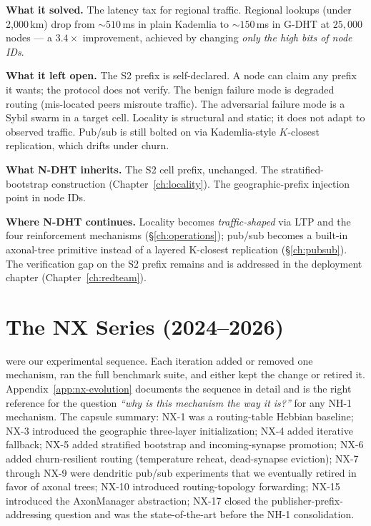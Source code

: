 \documentclass[twoside,nobib]{tufte-book}
\newcommand{\NDHT}{N-DHT\xspace}
\newcommand{\GDHT}{G-DHT\xspace}
\begin{document}
\textbf{What it solved.} The latency tax for regional traffic.
Regional lookups (under 2{,}000\,km) drop from $\sim 510$\,ms in
plain Kademlia to $\sim 150$\,ms in \GDHT at $25{,}000$ nodes ---
a $3.4\times$ improvement, achieved by changing \emph{only the
high bits of node IDs}.

\textbf{What it left open.} The S2 prefix is self-declared. A
node can claim any prefix it wants; the protocol does not
verify. The benign failure mode is degraded routing (mis-located
peers misroute traffic). The adversarial failure mode is a Sybil
swarm in a target cell. Locality is structural and static; it
does not adapt to observed traffic. Pub/sub is still bolted on
via Kademlia-style $K$-closest replication, which drifts under
churn.

\textbf{What \NDHT inherits.} The S2 cell prefix, unchanged. The
stratified-bootstrap construction (Chapter~\ref{ch:locality}). The
geographic-prefix injection point in node IDs.

\textbf{Where \NDHT continues.} Locality becomes
\emph{traffic-shaped} via LTP and the four reinforcement
mechanisms (\S\ref{ch:operations}); pub/sub becomes a built-in
axonal-tree primitive instead of a layered K-closest replication
(\S\ref{ch:pubsub}). The verification gap on the S2 prefix
remains and is addressed in the deployment chapter
(Chapter~\ref{ch:redteam}).

\section{The NX Series (2024--2026)}

 were our experimental sequence.
Each iteration added or removed one mechanism, ran the full
benchmark suite, and either kept the change or retired it.
Appendix~\ref{app:nx-evolution} documents the sequence in detail
and is the right reference for the question \emph{``why is this
mechanism the way it is?''} for any NH-1 mechanism. The capsule
summary: NX-1 was a routing-table Hebbian baseline; NX-3
introduced the geographic three-layer initialization; NX-4 added
iterative fallback; NX-5 added stratified bootstrap and
incoming-synapse promotion; NX-6 added churn-resilient routing
(temperature reheat, dead-synapse eviction); NX-7 through NX-9
were dendritic pub/sub experiments that we eventually retired in
favor of axonal trees; NX-10 introduced
routing-topology forwarding; NX-15 introduced the AxonManager
abstraction; NX-17 closed the publisher-prefix-addressing question
and was the state-of-the-art before the NH-1 consolidation.
\end{document}
